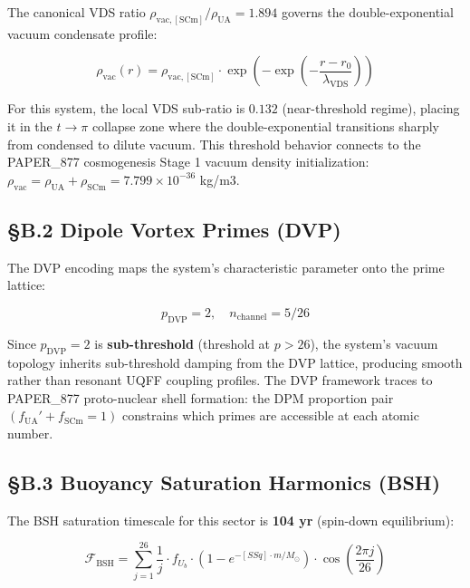 \documentclass[12pt,a4paper]{article}
\begin{document}
The canonical VDS ratio $\rho_{\mathrm{vac,[SCm]}} / \rho_{\mathrm{UA}} = 1.894$ governs the double-exponential vacuum condensate profile:

\begin{equation}
\rho_{\mathrm{vac}}(r) = \rho_{\mathrm{vac,[SCm]}} \cdot \exp\!\left(-\exp\!\left(-\frac{r - r_0}{\lambda_{\mathrm{VDS}}}\right)\right)
\end{equation}

For this system, the local VDS sub-ratio is $0.132$ (near-threshold regime), placing it in the $t \to \pi$ collapse zone where the double-exponential transitions sharply from condensed to dilute vacuum. This threshold behavior connects to the PAPER\_877 cosmogenesis Stage 1 vacuum density initialization: $\rho_{\mathrm{vac}} = \rho_{\mathrm{UA}} + \rho_{\mathrm{SCm}} = 7.799 \times 10^{-36}$ kg/m3.

\subsection{\S{}B.2 Dipole Vortex Primes (DVP)}

The DVP encoding maps the system's characteristic parameter onto the prime lattice:

\begin{equation}
p_{\mathrm{DVP}} = 2, \quad n_{\mathrm{channel}} = 5/26
\end{equation}

Since $p_{\mathrm{DVP}} = 2$ is \textbf{sub-threshold} (threshold at $p > 26$), the system's vacuum topology inherits sub-threshold damping from the DVP lattice, producing smooth rather than resonant UQFF coupling profiles. The DVP framework traces to PAPER\_877 proto-nuclear shell formation: the DPM proportion pair $(f_{\mathrm{UA}}' + f_{\mathrm{SCm}} = 1)$ constrains which primes are accessible at each atomic number.

\subsection{\S{}B.3 Buoyancy Saturation Harmonics (BSH)}

The BSH saturation timescale for this sector is \textbf{104 yr} (spin-down equilibrium):

\begin{equation}
\mathcal{F}_{\mathrm{BSH}} = \sum_{j=1}^{26} \frac{1}{j} \cdot f_U_b \cdot \left(1 - e^{-[SSq] \cdot m/M_\odot}\right) \cdot \cos\!\left(\frac{2\pi j}{26}\right)
\end{equation}
\end{document}
